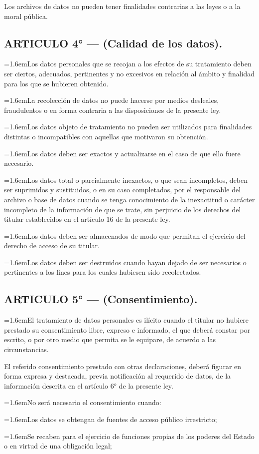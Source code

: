\documentclass[10pt,a4paper]{article}
\newcommand{\articulo}[1]{\subsection{#1}}
\newcommand{\inciso}[2]{\par{\hangindent=1.6em\hangafter=1\makebox[1.6em][l]{#1}#2\par}}
\begin{document}
Los archivos de datos no pueden tener finalidades contrarias a las leyes o a la moral pública.

\articulo{ARTICULO 4° — (Calidad de los datos).}
\inciso{1.}{Los datos personales que se recojan a los efectos de su tratamiento deben ser ciertos, adecuados, pertinentes y no excesivos en relación al ámbito y finalidad para los que se hubieren obtenido.}

\inciso{2.}{La recolección de datos no puede hacerse por medios desleales, fraudulentos o en forma contraria a las disposiciones de la presente ley.}

\inciso{3.}{Los datos objeto de tratamiento no pueden ser utilizados para finalidades distintas o incompatibles con aquellas que motivaron su obtención.}

\inciso{4.}{Los datos deben ser exactos y actualizarse en el caso de que ello fuere necesario.}

\inciso{5.}{Los datos total o parcialmente inexactos, o que sean incompletos, deben ser suprimidos y sustituidos, o en su caso completados, por el responsable del archivo o base de datos cuando se tenga conocimiento de la inexactitud o carácter incompleto de la información de que se trate, sin perjuicio de los derechos del titular establecidos en el artículo 16 de la presente ley.}

\inciso{6.}{Los datos deben ser almacenados de modo que permitan el ejercicio del derecho de acceso de su titular.}

\inciso{7.}{Los datos deben ser destruidos cuando hayan dejado de ser necesarios o pertinentes a los fines para los cuales hubiesen sido recolectados.}

\articulo{ARTICULO 5° — (Consentimiento).}
\inciso{1.}{El tratamiento de datos personales es ilícito cuando el titular no hubiere prestado su consentimiento libre, expreso e informado, el que deberá constar por escrito, o por otro medio que permita se le equipare, de acuerdo a las circunstancias.}

El referido consentimiento prestado con otras declaraciones, deberá figurar en forma expresa y destacada, previa notificación al requerido de datos, de la información descrita en el artículo 6° de la presente ley.

\inciso{2.}{No será necesario el consentimiento cuando:}

\inciso{a)}{Los datos se obtengan de fuentes de acceso público irrestricto;}

\inciso{b)}{Se recaben para el ejercicio de funciones propias de los poderes del Estado o en virtud de una obligación legal;}
\end{document}
